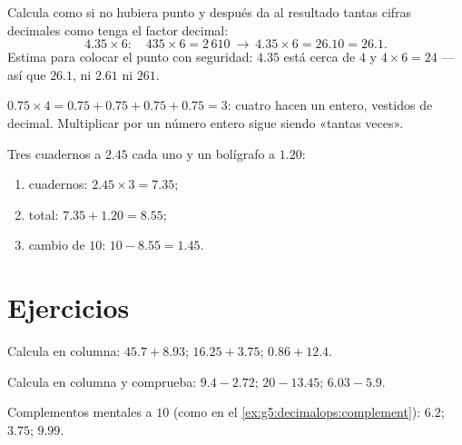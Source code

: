 \begin{method}\label{met:g5:decimalops:mult}
Calcula como si no hubiera punto y después da al resultado tantas
cifras decimales como tenga el factor decimal:
\[
4.35 \times 6: \quad 435 \times 6 = 2\,610
\ \to\ 4.35 \times 6 = 26.10 = 26.1 .
\]
Estima para colocar el punto con seguridad: $4.35$ está cerca de
$4$ y $4 \times 6 = 24$ --- así que $26.1$, ni $2.61$ ni $261$.
\end{method}

\begin{example}\label{ex:g5:decimalops:mult}
$0.75 \times 4 = 0.75 + 0.75 + 0.75 + 0.75 = 3$: cuatro  hacen
un entero, vestidos de decimal. Multiplicar por un número entero sigue siendo
«tantas veces».
\end{example}

\begin{example}[De compras]\label{ex:g5:decimalops:shopping}
Tres cuadernos a $2.45$ cada uno y un bolígrafo a $1.20$:
\begin{enumerate}
  \item cuadernos: $2.45 \times 3 = 7.35$;
  \item total: $7.35 + 1.20 = 8.55$;
  \item cambio de $10$: $10 - 8.55 = 1.45$.
\end{enumerate}
\end{example}

\section{Ejercicios}

\begin{exercise}[$\star$]\label{exo:g5:decimalops:1}
Calcula en columna: $45.7 + 8.93$; \quad $16.25 + 3.75$; \quad
$0.86 + 12.4$.
\end{exercise}

\begin{exercise}[$\star$]\label{exo:g5:decimalops:2}
Calcula en columna y comprueba: $9.4 - 2.72$; \quad $20 - 13.45$;
\quad $6.03 - 5.9$.
\end{exercise}

\begin{exercise}[$\star$]\label{exo:g5:decimalops:3}
Complementos mentales a $10$ (como en el
\cref{ex:g5:decimalops:complement}): $6.2$; \quad $3.75$; \quad
$9.99$.
\end{exercise}

